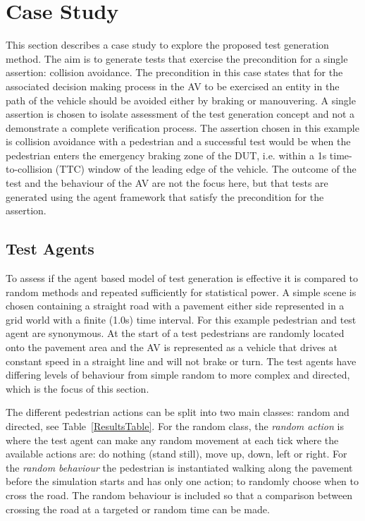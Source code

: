 \documentclass[letterpaper, 10 pt, journal, twoside]{IEEEtran}
\begin{document}
\section{Case Study} \label{CaseStudy}
 
This section describes a case study to explore the proposed test generation method. The aim is to generate tests that exercise the precondition for a single assertion: collision avoidance. The precondition in this case states that for the associated decision making process in the AV to be exercised an entity in the path of the vehicle should be avoided either by braking or manouvering.  A single assertion is chosen to isolate assessment of the test generation concept and not a demonstrate a complete verification process. The assertion chosen in this example is collision avoidance with a pedestrian and a successful test would be when the pedestrian enters the emergency braking zone of the DUT, i.e. within a 1s time-to-collision (TTC) window of the leading edge of the vehicle. The outcome of the test and the behaviour of the AV are not the focus here, but that tests are generated using the agent framework that satisfy the precondition for the assertion. 

\subsection{Test Agents}
To assess if the agent based model of test generation is effective it is compared to random methods and repeated sufficiently for statistical power. A simple scene is chosen containing a straight road with a pavement either side represented in a grid world with a finite (1.0s) time interval. For this example pedestrian and test agent are synonymous. At the start of a test pedestrians are randomly located onto the pavement area and the AV is represented as a vehicle that drives at constant speed in a straight line and will not brake or turn. The test agents have differing levels of behaviour from simple random to more complex and directed, which is the focus of this section. 

The different pedestrian actions can be split into two main classes: random and directed, see Table~\ref{ResultsTable}. For the random class, the \textit{random action} is where the test agent can make any random movement at each tick where the available actions are: do nothing (stand still), move up, down, left or right. For the \textit{random behaviour} the pedestrian is instantiated walking along the pavement before the simulation starts and has only one action; to randomly choose when to cross the road. The random behaviour is included so that a comparison between crossing the road at a targeted or random time can be made. 
\end{document}
